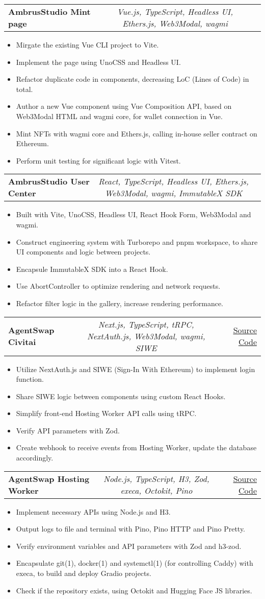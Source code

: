 \documentclass[a4paper,11pt]{article}
\makeatletter
\newcommand{\resumeItem}[1]{
  \item\small{#1}
}
\newcommand{\resumeItemListStart}{\begin{itemize}[rightmargin=0.11in]}
\newcommand{\resumeItemListEnd}{\end{itemize}}
\newcommand{\resumeTrioHeading}[3]{
  \item\small{
    \begin{tabular*}{0.96\textwidth}[t]{
      l@{\extracolsep{\fill}}c@{\extracolsep{\fill}}r
    }
      \textbf{#1} & \textit{#2} & #3
    \end{tabular*}
  }
}
\makeatother
\begin{document}
  \resumeTrioHeading{AmbrusStudio Mint page}{Vue.js, TypeScript, Headless UI, Ethers.js, Web3Modal, wagmi}{}
  \resumeItemListStart{}
    \resumeItem{Mirgate the existing Vue CLI project to Vite.}
    \resumeItem{Implement the page using UnoCSS and Headless UI.}
    \resumeItem{Refactor duplicate code in components, decreasing LoC (Lines of Code) in total.}
    \resumeItem{Author a new Vue component using Vue Composition API, based on Web3Modal HTML and wagmi core, for wallet connection in Vue.}
    \resumeItem{Mint NFTs with wagmi core and Ethers.js, calling in-house seller contract on Ethereum.}
    \resumeItem{Perform unit testing for significant logic with Vitest.}
  \resumeItemListEnd{}

  \resumeTrioHeading{AmbrusStudio User Center}{React, TypeScript, Headless UI, Ethers.js, Web3Modal, wagmi, ImmutableX SDK}{}
  \resumeItemListStart{}
    \resumeItem{Built with Vite, UnoCSS, Headless UI, React Hook Form, Web3Modal and wagmi.}
    \resumeItem{Construct engineering system with Turborepo and pnpm workspace, to share UI components and logic between projects.}
    \resumeItem{Encapsule ImmutableX SDK into a React Hook.}
    \resumeItem{Use AbortController to optimize rendering and network requests.}
    \resumeItem{Refactor filter logic in the gallery, increase rendering performance.}
  \resumeItemListEnd{}

  \resumeTrioHeading{AgentSwap Civitai}{Next.js, TypeScript, tRPC, NextAuth.js, Web3Modal, wagmi, SIWE}{\href{https://github.com/agentswap/civitai}{\uline{Source Code}}}
  \resumeItemListStart{}
    \resumeItem{Utilize NextAuth.js and SIWE (Sign-In With Ethereum) to implement login function.}
    \resumeItem{Share SIWE logic between components using custom React Hooks.}
    \resumeItem{Simplify front-end Hosting Worker API calls using tRPC.}
    \resumeItem{Verify API parameters with Zod.}
    \resumeItem{Create webhook to receive events from Hosting Worker, update the database accordingly.}
  \resumeItemListEnd{}

  \resumeTrioHeading{AgentSwap Hosting Worker}{Node.js, TypeScript, H3, Zod, execa, Octokit, Pino}{\href{https://github.com/agentswap/hosting-worker}{\uline{Source Code}}}
  \resumeItemListStart{}
    \resumeItem{Implement necessary APIs using Node.js and H3.}
    \resumeItem{Output logs to file and terminal with Pino, Pino HTTP and Pino Pretty.}
    \resumeItem{Verify environment variables and API parameters with Zod and h3-zod.}
    \resumeItem{Encapsulate git(1), docker(1) and systemctl(1) (for controlling Caddy) with execa, to build and deploy Gradio projects.}
    \resumeItem{Check if the repository exists, using Octokit and Hugging Face JS libraries.}
  \resumeItemListEnd{}
\end{document}
